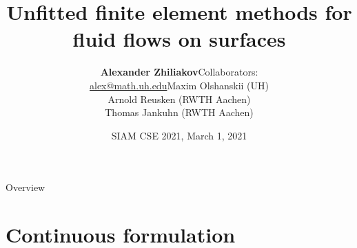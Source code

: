 \documentclass[svgnames]{beamer} %
\title[Trace FEM]{Unfitted finite element methods for fluid flows on surfaces}
\institute[UH] {
	\includegraphicsw[.3]{logo_uh.png}
}
\date[October 17, 2020]{SIAM CSE 2021, March 1, 2021}
\begin{document}
	\author[Alex Zhiliakov]{%
		\small\begin{tabular}[1.]{cl}
			\textbf{Alexander Zhiliakov} & \qquad Collaborators: \\
			\href{mailto:alex@math.uh.edu}{alex@math.uh.edu} & \qquad Maxim Olshanskii (UH) \\
			& \qquad Arnold Reusken (RWTH Aachen) \\
			& \qquad Thomas Jankuhn (RWTH Aachen)
		\end{tabular}
		\vskip -1mm
	}

	\begin{frame}
		\titlepage
	\end{frame}

	\begin{frame}{Overview}
		\tableofcontents
	\end{frame}

	\section{Continuous formulation}
	
\end{document}
